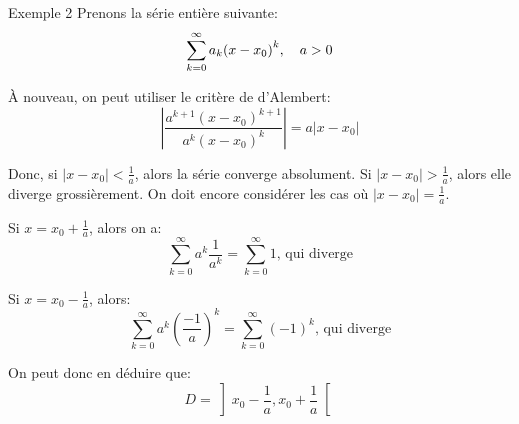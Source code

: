 \documentclass[a4paper]{article}
\begin{document}
\begin{parag}{Exemple 2}
    Prenons la série entière suivante:
    \[\sum_{k=0}^{\infty} a_k\left(x - x_0\right)^k, \mathspace a > 0\]

    À nouveau, on peut utiliser le critère de d'Alembert:
    \[\left|\frac{a^{k+1}\left(x - x_0\right)^{k+1}}{a^k \left(x - x_0\right)^k}\right| = a \left|x - x_0\right|\]

    Donc, si $\left|x - x_0\right| < \frac{1}{a}$, alors la série converge absolument. Si $\left|x - x_0\right| > \frac{1}{a}$, alors elle diverge grossièrement. On doit encore considérer les cas où $\left|x - x_0\right| = \frac{1}{a}$.

    Si $x = x_0 + \frac{1}{a}$, alors on a:
    \[\sum_{k=0}^{\infty} a^k \frac{1}{a^k} = \sum_{k=0}^{\infty} 1 \text{, qui diverge}\]

    Si $x = x_0 - \frac{1}{a}$, alors:
    \[\sum_{k=0}^{\infty} a^k \left(\frac{-1}{a}\right)^k = \sum_{k=0}^{\infty} \left(-1\right)^k \text{, qui diverge}\]

    On peut donc en déduire que:
    \[D = \left]x_0 - \frac{1}{a}, x_0 + \frac{1}{a}\right[ \]
\end{parag}
\end{document}
